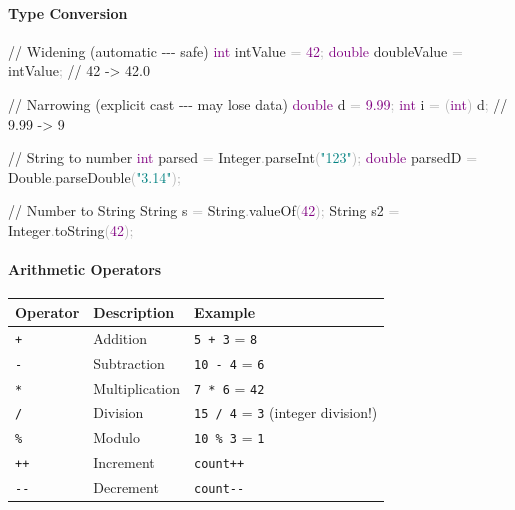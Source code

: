 \documentclass[
  justified,
  openright,
]{tufte-book}
\let\subsubsection\paragraph
\let\paragraph\paragraph
\newcommand{\BuiltInTok}[1]{#1}
\newcommand{\CommentTok}[1]{\textcolor{MidGray}{#1}}
\newcommand{\DataTypeTok}[1]{\textcolor{Purple}{#1}}
\newcommand{\DecValTok}[1]{\textcolor{Purple}{#1}}
\newcommand{\FloatTok}[1]{\textcolor{Purple}{#1}}
\newcommand{\FunctionTok}[1]{\textcolor{BrandBlue}{#1}}
\newcommand{\NormalTok}[1]{#1}
\newcommand{\OperatorTok}[1]{\textcolor{DarkGray}{#1}}
\newcommand{\StringTok}[1]{\textcolor{Teal}{#1}}
\newenvironment{Shaded}{%
  \begin{snugshade}
}{%
  \end{snugshade}
}
\let\subsubsection\paragraph
\let\paragraph\paragraph
\begin{document}
\subsubsection{Type Conversion}\label{type-conversion}

\begin{Shaded}
\begin{Highlighting}[]
\CommentTok{// Widening (automatic {-}{-}{-} safe)}
\DataTypeTok{int}\NormalTok{ intValue }\OperatorTok{=} \DecValTok{42}\OperatorTok{;}
\DataTypeTok{double}\NormalTok{ doubleValue }\OperatorTok{=}\NormalTok{ intValue}\OperatorTok{;}   \CommentTok{// 42 {-}\textgreater{} 42.0}

\CommentTok{// Narrowing (explicit cast {-}{-}{-} may lose data)}
\DataTypeTok{double}\NormalTok{ d }\OperatorTok{=} \FloatTok{9.99}\OperatorTok{;}
\DataTypeTok{int}\NormalTok{ i }\OperatorTok{=} \OperatorTok{(}\DataTypeTok{int}\OperatorTok{)}\NormalTok{ d}\OperatorTok{;}                 \CommentTok{// 9.99 {-}\textgreater{} 9}

\CommentTok{// String to number}
\DataTypeTok{int}\NormalTok{ parsed }\OperatorTok{=} \BuiltInTok{Integer}\OperatorTok{.}\FunctionTok{parseInt}\OperatorTok{(}\StringTok{"123"}\OperatorTok{);}
\DataTypeTok{double}\NormalTok{ parsedD }\OperatorTok{=} \BuiltInTok{Double}\OperatorTok{.}\FunctionTok{parseDouble}\OperatorTok{(}\StringTok{"3.14"}\OperatorTok{);}

\CommentTok{// Number to String}
\BuiltInTok{String}\NormalTok{ s }\OperatorTok{=} \BuiltInTok{String}\OperatorTok{.}\FunctionTok{valueOf}\OperatorTok{(}\DecValTok{42}\OperatorTok{);}
\BuiltInTok{String}\NormalTok{ s2 }\OperatorTok{=} \BuiltInTok{Integer}\OperatorTok{.}\FunctionTok{toString}\OperatorTok{(}\DecValTok{42}\OperatorTok{);}
\end{Highlighting}
\end{Shaded}

\subsubsection{Arithmetic Operators}\label{arithmetic-operators}

{\def\LTcaptype{none} %
\begin{longtable}[]{@{}lll@{}}
\toprule\noalign{}
Operator & Description & Example \\
\midrule\noalign{}
\endhead
\bottomrule\noalign{}
\endlastfoot
\texttt{+} & Addition & \texttt{5\ +\ 3} = \texttt{8} \\
\texttt{-} & Subtraction & \texttt{10\ -\ 4} = \texttt{6} \\
\texttt{*} & Multiplication & \texttt{7\ *\ 6} = \texttt{42} \\
\texttt{/} & Division & \texttt{15\ /\ 4} = \texttt{3} (integer
division!) \\
\texttt{\%} & Modulo & \texttt{10\ \%\ 3} = \texttt{1} \\
\texttt{++} & Increment & \texttt{count++} \\
\texttt{-\/-} & Decrement & \texttt{count-\/-} \\
\end{longtable}
}
\end{document}
